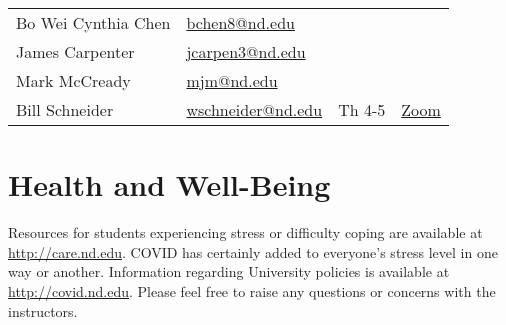 \documentclass[11pt]{article}
\begin{document}
\begin{center}
\begin{tabular}{llll}
Bo Wei Cynthia Chen & \href{mailto:bchen8@nd.edu}{bchen8@nd.edu} &  & \\
James Carpenter & \href{mailto:jcarpen3@nd.edu}{jcarpen3@nd.edu} &  & \\
Mark McCready & \href{mailto:mjm@nd.edu}{mjm@nd.edu} &  & \\
Bill Schneider & \href{mailto:wschneider@nd.edu}{wschneider@nd.edu} & Th 4-5 & \href{https://www.google.com/url?q=https://notredame.zoom.us/j/94668744704?pwd\%3DbXF2Q1RuSTZOamYxc2RpZUNSM1BKUT09\&sa=D\&source=calendar\&ust=1629999731737672\&usg=AOvVaw3KPyMONj9lQaVPwtRlCPVG}{Zoom}\\
\end{tabular}
\end{center}

\section{Health and Well-Being}
\label{sec:orgedee08e}
Resources for students experiencing stress or difficulty coping are available at \url{http://care.nd.edu}. COVID has certainly added to everyone's stress level in one way or another. Information regarding University policies is available at \url{http://covid.nd.edu}.  Please feel free to raise any questions or concerns with the instructors.
\end{document}
